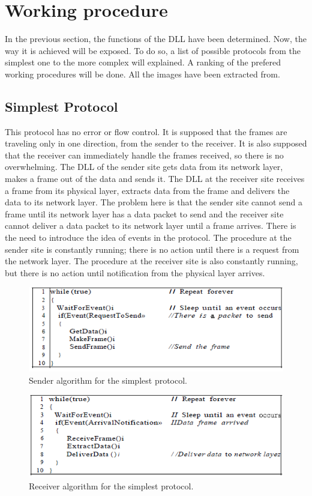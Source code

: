 \documentclass[12pt,a4paper]{report}
\begin{document}
\section{Working procedure}
In the previous section, the functions of the DLL have been determined. Now, the way it is achieved will be exposed. To do so, a list of possible protocols from the simplest one to the more complex will explained. A ranking of the prefered working procedures will be done. All the images have been extracted from\cite{Forouzan2012}.
\subsection{Simplest Protocol}
This protocol has no error or flow control. It is supposed that the frames are traveling only in one direction, from the sender to the receiver. It is also supposed that the receiver can immediately handle the frames received, so there is no overwhelming. The DLL of the sender site gets data from its network layer, makes a frame out of the data and sends it.
The DLL at the receiver site receives a frame from its physical layer, extracts data from the frame and delivers the data to its network layer. The problem here is that the sender site cannot send a frame until its network layer has a data packet to send and the receiver site cannot deliver a data packet to its network layer until a frame arrives. There is the need to introduce the idea of events in the protocol. The
procedure at the sender site is constantly running; there is no action until there is a request
from the network layer. The procedure at the receiver site is also constantly running, but
there is no action until notification from the physical layer arrives.
\begin{figure}[H]
\begin{center}
\includegraphics[scale=1]{simplestsender.PNG}
\caption{Sender algorithm for the simplest protocol.}
\end{center}
\end{figure}
\begin{figure}[H]
\begin{center}
\includegraphics[scale=1]{simplestreceiver.PNG}
\caption{Receiver algorithm for the simplest protocol.}
\end{center}
\end{figure}
\end{document}
